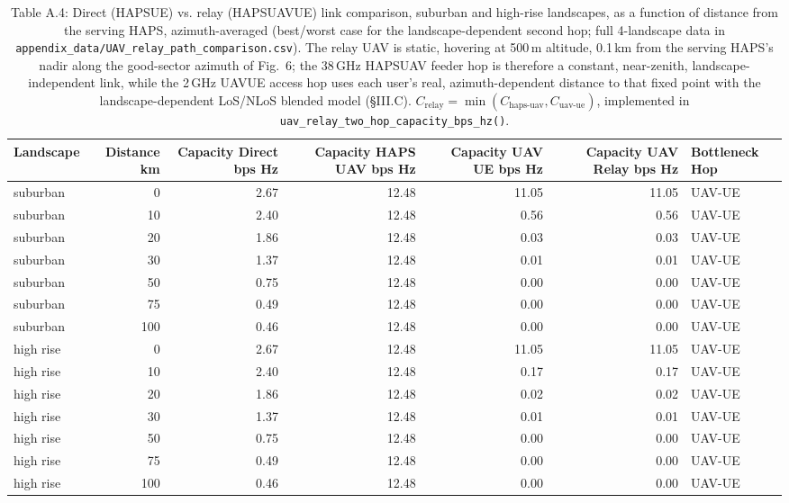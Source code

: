 \begin{table}[htbp]
\centering
\small
\begin{tabular}{lrrrrrl}
\toprule
Landscape & Distance km & Capacity Direct bps Hz & Capacity HAPS UAV bps Hz & Capacity UAV UE bps Hz & Capacity UAV Relay bps Hz & Bottleneck Hop \\
\midrule
suburban & 0 & 2.67 & 12.48 & 11.05 & 11.05 & UAV-UE \\
suburban & 10 & 2.40 & 12.48 & 0.56 & 0.56 & UAV-UE \\
suburban & 20 & 1.86 & 12.48 & 0.03 & 0.03 & UAV-UE \\
suburban & 30 & 1.37 & 12.48 & 0.01 & 0.01 & UAV-UE \\
suburban & 50 & 0.75 & 12.48 & 0.00 & 0.00 & UAV-UE \\
suburban & 75 & 0.49 & 12.48 & 0.00 & 0.00 & UAV-UE \\
suburban & 100 & 0.46 & 12.48 & 0.00 & 0.00 & UAV-UE \\
high rise & 0 & 2.67 & 12.48 & 11.05 & 11.05 & UAV-UE \\
high rise & 10 & 2.40 & 12.48 & 0.17 & 0.17 & UAV-UE \\
high rise & 20 & 1.86 & 12.48 & 0.02 & 0.02 & UAV-UE \\
high rise & 30 & 1.37 & 12.48 & 0.01 & 0.01 & UAV-UE \\
high rise & 50 & 0.75 & 12.48 & 0.00 & 0.00 & UAV-UE \\
high rise & 75 & 0.49 & 12.48 & 0.00 & 0.00 & UAV-UE \\
high rise & 100 & 0.46 & 12.48 & 0.00 & 0.00 & UAV-UE \\
\bottomrule
\end{tabular}

\caption{Table A.4: Direct (HAPS\textrightarrow UE) vs. relay (HAPS\textrightarrow UAV\textrightarrow UE) link comparison, suburban and high-rise landscapes, as a function of distance from the serving HAPS, azimuth-averaged (best/worst case for the landscape-dependent second hop; full 4-landscape data in \texttt{appendix\_data/UAV\_relay\_path\_comparison.csv}). The relay UAV is static, hovering at 500\,m altitude, 0.1\,km from the serving HAPS's nadir along the good-sector azimuth of Fig.~6; the 38\,GHz HAPS\textrightarrow UAV feeder hop is therefore a constant, near-zenith, landscape-independent link, while the 2\,GHz UAV\textrightarrow UE access hop uses each user's real, azimuth-dependent distance to that fixed point with the landscape-dependent LoS/NLoS blended model (\S III.C). $C_{\text{relay}} = \min(C_{\text{haps-uav}}, C_{\text{uav-ue}})$, implemented in \texttt{uav\_relay\_two\_hop\_capacity\_bps\_hz()}.}
\label{table:app-uav-relay-comparison}
\end{table}
